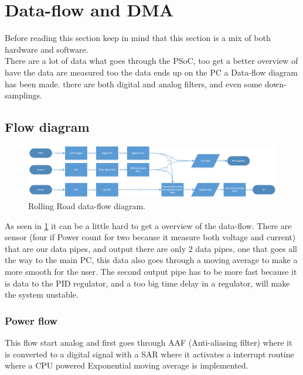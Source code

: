 \newpage
\section{Data-flow and DMA}


Before reading this section keep in mind that this section is a mix of both hardware and software.\\ 
There are a lot of data what goes through the PSoC, too get a better overview of have the data are measured too the data ends up on the PC a Data-flow diagram has been made. there are both digital and analog filters, and even some down-samplings.

\subsection{Flow diagram}

\begin{figure}[H]
	\centering
	\includegraphics [width=6in]{Software/Pictures/data-flow.png}
	\caption{Rolling Road data-flow diagram.}
	\label{fig:data_flow_diagram}
\end{figure}

As seen in \ref{fig:data_flow_diagram} it can be a little hard to get a overview of the data-flow. There are sensor (four if Power count for two because it measure both voltage and current) that are our data pipes, and output there are only 2 data pipes, one that goes all the way to the main PC, this data also goes through a moving average to make a more smooth for the user. The second output pipe has to be more fast because it is data to the PID regulator, and a too big time delay in a regulator, will make the system unstable.    

\subsubsection{Power flow}  

This flow start analog and first goes through AAF (Anti-aliasing filter) where it is converted to a digital signal with a SAR where it activates a interrupt routine where a CPU powered Exponential moving average is implemented.     

